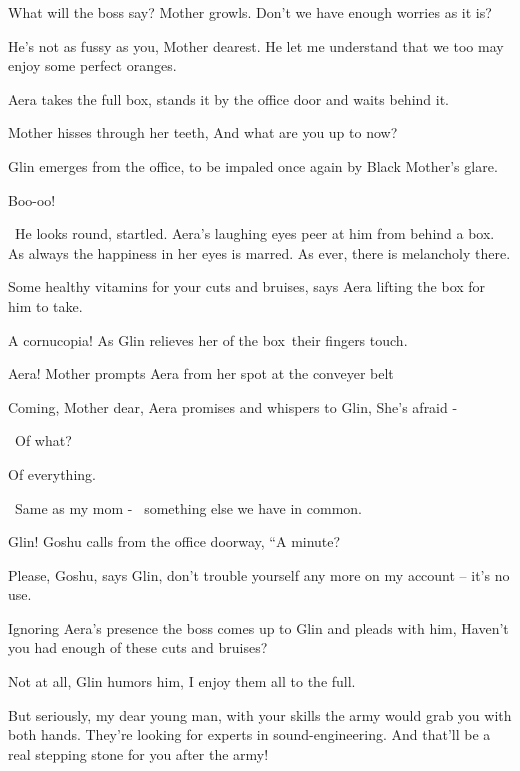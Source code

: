 \documentclass[letterpaper]{article}
\begin{document}
{\textquotedbl}What will the boss say?{\textquotedbl} Mother growls. {\textquotedbl}Don't we have enough worries as it
is?{\textquotedbl} 

{\textquotedbl}He's not as fussy as you, Mother dearest. He let me understand that we too may enjoy some perfect
oranges.{\textquotedbl} 

Aera takes the full box, stands it by the office door and waits behind it.

Mother hisses through her teeth, {\textquotedbl}And what are you up to now?{\textquotedbl}

Glin emerges from the office, to be impaled once again by Black Mother's glare. 

{\textquotedbl}Boo-oo!{\textquotedbl}

~He looks round, startled. Aera's laughing eyes peer at him from behind a box. As always the happiness in her eyes is
marred. As ever, there is melancholy there. 

{\textquotedbl}Some healthy vitamins for your cuts and bruises,{\textquotedbl} says Aera lifting the box for him to
take. 

{\textquotedbl}A cornucopia!{\textquotedbl} As Glin relieves her of the box~their fingers touch.

{\textquotedbl}Aera!{\textquotedbl} Mother prompts Aera from her spot at the conveyer belt 

{\textquotedbl}Coming, Mother dear,{\textquotedbl} Aera promises and whispers to Glin, {\textquotedbl}She's afraid
-{\textquotedbl} 

~{\textquotedbl}Of what?{\textquotedbl} 

{\textquotedbl}Of everything.{\textquotedbl} 

~{\textquotedbl}Same as my mom - \ something else we have in common.{\textquotedbl}

{\textquotedbl}Glin!{\textquotedbl} Goshu calls from the office doorway, ``A minute?{\textquotedbl} 

{\textquotedbl}Please, Goshu,{\textquotedbl} says Glin, {\textquotedbl}don't trouble yourself any more on my account --
it's no use.{\textquotedbl}

Ignoring Aera's presence the boss comes up to Glin and pleads with him, {\textquotedbl}Haven't you had enough of these
cuts and bruises?{\textquotedbl}

{\textquotedbl}Not at all,{\textquotedbl} Glin humors him, {\textquotedbl}I enjoy them all to the full.{\textquotedbl}

{\textquotedbl}But seriously, my dear young man, with your skills the army would grab you with both hands. They're
looking for experts in sound-engineering. And that'll be a real stepping stone for you after the army!{\textquotedbl} 
\end{document}

